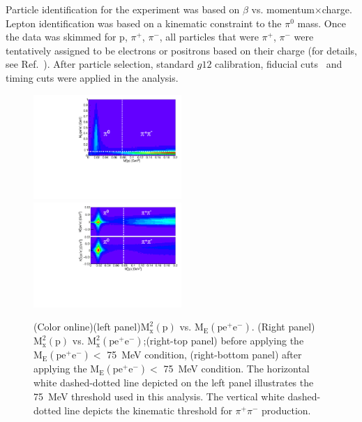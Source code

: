 \documentclass[aps,prc,twocolumn,floatfix,showpacs,preprintnumbers,amsmath,amssymb,superscriptaddress,linenumbers]{revtex4-1}
\begin{document}

Particle identification for the experiment was based on $\beta$ vs. momentum$\times$charge. 
Lepton identification was based on a kinematic constraint to the $\pi^0$ mass. 
Once the data was skimmed for p, $\pi^+$, $\pi^-$, 
all particles that were $\pi^+$, $\pi^-$ were tentatively assigned 
to be electrons or positrons based on their charge (for details, 
see Ref.~\cite{Kunkel}). After particle selection, standard $g12$ 
calibration, fiducial cuts~\cite{g12} and timing cuts were applied 
in the analysis.
\begin{figure}[htb!]
        \centerline{
               \includegraphics[height=0.35\textwidth,width=0.5\textwidth]{ME_vs_mxpcompare.pdf}\hfill
               \includegraphics[height=0.35\textwidth,width=0.5\textwidth]{mm2_vs_mxp_compare.pdf}}

        \caption{(Color online)(left panel)$\mathrm{M_x^2(p)}$ vs.
        $\mathrm{M_E(pe^+e^-)}$. (Right panel)$\mathrm{M_x^2(p)}$ vs.
        $\mathrm{M_x^2(pe^+e^-)}$;(right-top panel) before applying the
        $\mathrm{M_E(pe^+e^-)} <$ 75~MeV condition, (right-bottom panel)
        after applying the $\mathrm{M_E(pe^+e^-)} <$ 75~MeV condition.
        The horizontal white dashed-dotted line depicted on the left
        panel illustrates the 75~MeV threshold used in this analysis.
        The vertical white dashed-dotted line depicts the kinematic
        threshold for $\pi^+\pi^-$ production.
        }\label{fig:sys}
\end{figure}
\end{document}
